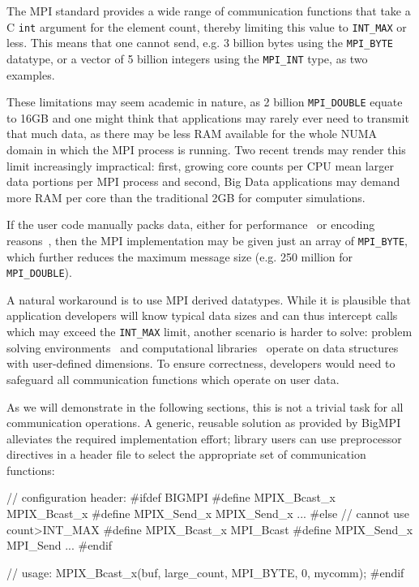 The MPI standard provides a wide range of communication functions that
take a C \texttt{int} argument for the element count, thereby limiting this
value to \texttt{INT\_MAX} or less.
This means that one cannot send, e.g. 3 billion bytes using the \texttt{MPI\_BYTE} 
datatype, or a vector of 5 billion integers using the \texttt{MPI\_INT} type, as
two examples.

These limitations may seem academic in nature, as 2 billion
\texttt{MPI\_DOUBLE} equate to 16GB and one might think that
applications may rarely ever need to transmit that much data, as there
may be less RAM available for the whole NUMA domain in which the MPI
process is running. Two recent trends may render this limit
increasingly impractical: first, growing core counts per CPU mean
larger data portions per MPI process and second, Big Data applications
may demand more RAM per core than the traditional 2GB for computer
simulations.

If the user code manually packs data, either for
performance~\cite{jenkins2012enabling} or encoding
reasons~\cite{boostmpi}, then the MPI implementation may be given just
an array of \texttt{MPI\_BYTE}, which further reduces the maximum
message size (e.g. 250 million for \texttt{MPI\_DOUBLE}).

A natural workaround is to use MPI derived datatypes. While it is
plausible that application developers will know typical data sizes and
can thus intercept calls which may exceed the \texttt{INT\_MAX} limit,
another scenario is harder to solve: problem solving
environments~\cite{cactus:SC01, gromacs} and computational
libraries~\cite{physis, libgeodecomp} operate on data structures with
user-defined dimensions. To ensure correctness, developers would need
to safeguard all communication functions which operate on user data.

As we will demonstrate in the following sections, this is not a
trivial task for all communication operations. A generic, reusable
solution as provided by BigMPI alleviates the required implementation
effort; library users can use preprocessor directives in a header file
to select the appropriate set of communication functions:

\begin{code}
// configuration header:
#ifdef BIGMPI
#define MPIX_Bcast_x MPIX_Bcast_x
#define MPIX_Send_x MPIX_Send_x
...
#else // cannot use count>INT_MAX
#define MPIX_Bcast_x MPI_Bcast
#define MPIX_Send_x MPI_Send
...
#endif

// usage:
    MPIX_Bcast_x(buf, large_count, MPI_BYTE, 0, mycomm);
#endif
\end{code}

